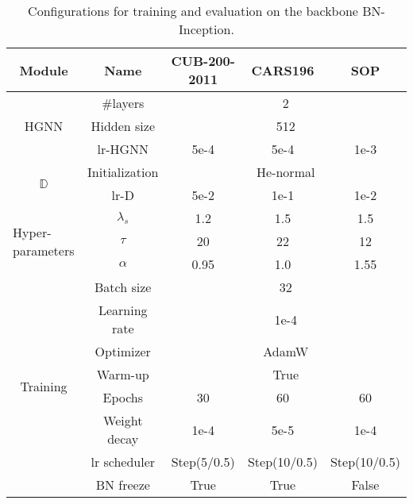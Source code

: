 \begin{table}[ht!]
\centering
\begin{tabular}{ccccc}
\toprule[0.8pt]
\textbf{Module}                                                & \textbf{Name}           & \textbf{CUB-200-2011} & \textbf{CARS196}      & \textbf{SOP}          \\ \hline \hline
\multirow{3}{*}{HGNN}                                 & \#layers       & \multicolumn{3}{c}{2}                      \\
                                                      & Hidden size    & \multicolumn{3}{c}{512}                    \\
                                                      & lr-HGNN        & 5e-4         & 5e-4         & 1e-3         \\ \hline
\multirow{2}{*}{$\mathbb{D}$}                                    & Initialization & \multicolumn{3}{c}{He-normal}              \\
                                                      & lr-D           & 5e-2         & 1e-1         & 1e-2         \\ \hline
\multicolumn{1}{l}{\multirow{3}{*}{Hyper-parameters}} & $\lambda_s$         & 1.2          & 1.5          & 1.5          \\
\multicolumn{1}{l}{}                                  & $\tau$            & 20           & 22           & 12           \\
\multicolumn{1}{l}{}                                  & $\alpha$          & 0.95         & 1.0          & 1.55         \\ \hline
\multirow{8}{*}{Training}                             & Batch size     & \multicolumn{3}{c}{32}                     \\
                                                      & Learning rate  & \multicolumn{3}{c}{1e-4}                   \\
                                                      & Optimizer      & \multicolumn{3}{c}{AdamW}                  \\
                                                      & Warm-up        & \multicolumn{3}{c}{True}                   \\
                                                      & Epochs         & 30           & 60           & 60           \\
                                                      & Weight decay   & 1e-4         & 5e-5         & 1e-4         \\
                                                      & lr scheduler   & Step(5/0.5)  & Step(10/0.5) & Step(10/0.5) \\
                                                      & BN freeze      & True         & True         & False        \\ 
\bottomrule[0.8pt]
\end{tabular}
\caption{Configurations for training and evaluation on the backbone BN-Inception.}
\label{training_params_BN}
\end{table}

